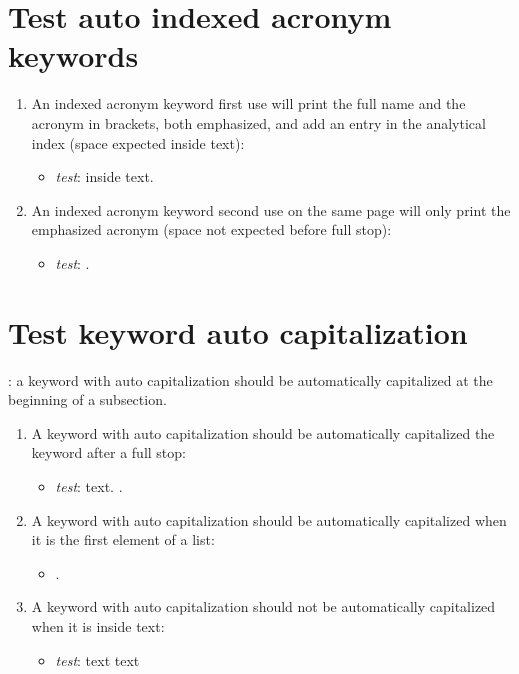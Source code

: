 \section{Test auto indexed acronym keywords}

\begin{enumerate}

\item An indexed acronym keyword first use will print the full name and the acronym in brackets, both emphasized, and add an entry in the analytical index (space expected inside text):
\begin{itemize}
\item \textit{test}: \AIAKE inside text.
\end{itemize}

\item An indexed acronym keyword second use on the same page will only print the emphasized acronym (space not expected before full stop): 
\begin{itemize}
\item \textit{test}: \AIAKE.
\end{itemize}

\end{enumerate}

\section{Test keyword auto capitalization}

\autocapKeywordExample: a keyword with auto capitalization should be automatically capitalized at the beginning of a subsection.

\begin{enumerate}

\item A keyword with auto capitalization should be automatically capitalized the keyword after a full stop:
\begin{itemize}
\item \textit{test}: text. \autocapKeywordExample.
\end{itemize}

\item A keyword with auto capitalization should be automatically capitalized when it is the first element of a list:
\begin{itemize}
\item \autocapKeywordExample.
\end{itemize}

\item A keyword with auto capitalization should not be automatically capitalized when it is inside text:
\begin{itemize}
\item \textit{test}: text \autocapKeywordExample text
\end{itemize}

\end{enumerate}

